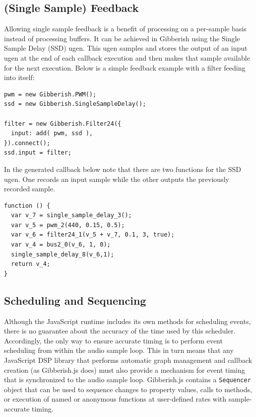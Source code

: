 \subsection{(Single Sample) Feedback}
Allowing single sample feedback is a benefit of processing on a per-sample basis instead of processing buffers. It can be achieved in Gibberish using the Single Sample Delay (SSD) ugen. This ugen samples and stores the output of an input ugen at the end of each callback execution and then makes that sample available for the next execution. Below is a simple feedback example with a filter feeding into itself:

{\small {\begin{verbatim}
pwm = new Gibberish.PWM();
ssd = new Gibberish.SingleSampleDelay();

filter = new Gibberish.Filter24({
  input: add( pwm, ssd ),
}).connect();
ssd.input = filter;
\end{verbatim}}}

In the generated callback below note that there are two functions for the SSD ugen. One records an input sample while the other outputs the previously recorded sample.

{\small {\begin{verbatim}
function () {
  var v_7 = single_sample_delay_3();
  var v_5 = pwm_2(440, 0.15, 0.5);
  var v_6 = filter24_1(v_5 + v_7, 0.1, 3, true);
  var v_4 = bus2_0(v_6, 1, 0);
  single_sample_delay_8(v_6,1);
  return v_4;
} 
\end{verbatim}}}


\subsection{Scheduling and Sequencing}
\label{Roberts:sec:scheduling}

Although the JavaScript runtime includes its own methods for scheduling events, there is no guarantee about the accuracy of the time used by this scheduler. Accordingly, the only way to ensure accurate timing is to perform event scheduling from within the audio sample loop. This in turn means that any JavaScript DSP library that performs automatic graph management and callback creation (as Gibberish.js does) must also provide a mechanism for event timing that is synchronized to the audio sample loop. Gibberish.js contains a \texttt{Sequencer} object that can be used to sequence changes to property values, calls to methods, or execution of named or anonymous functions at user-defined rates with sample-accurate timing.

